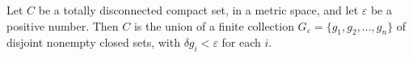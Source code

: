 Let $C$ be a totally disconnected compact set, in a metric space, and let $\varepsilon$ be a positive number. Then $C$ is the union of a finite collection $G_\varepsilon = \{g_1, g_2, \ldots, g_n\}$ of disjoint nonempty closed sets, with $\delta g_i < \varepsilon$ for each $i$.
